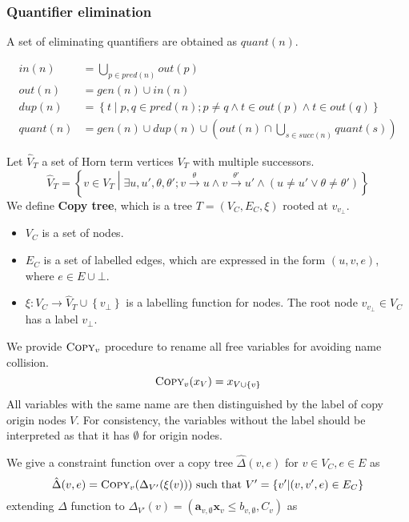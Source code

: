 \documentclass[a4paper,12pt]{article}
\newcommand{\edgel}[3]{#1\xrightarrow{#2}#3}
\begin{document}
\subsubsection{Quantifier elimination}

A set of eliminating quantifiers are obtained as $quant(n)$.

\begin{align*}
in(n) & = \bigcup_{p\in pred(n)} out(p) \\
out(n) & = gen(n) \cup in(n) \\
dup(n) & = \left\lbrace t \middle| p,q \in pred(n); p \ne q \wedge
 t \in out(p) \wedge t \in out(q) \right\rbrace \\
quant(n) & = gen(n) \cup dup(n) \cup
 (out(n) \cap \bigcup_{s \in succ(n)} quant(s))
\end{align*}

Let $\hat V_T$ a set of Horn term vertices $V_T$ with multiple
successors.
\[ \hat V_T = \left\lbrace v \in V_T \middle|
\exists u, u', \theta, \theta';
\edgel{v}{\theta}{u} \wedge \edgel{v}{\theta'}{u'} \wedge
(u \ne u' \vee \theta \ne \theta') \right\rbrace \]
We define \textbf{Copy tree}, which is a tree $T=(V_C,E_C,\xi)$
rooted at $v_{v_\bot}$.
\begin{itemize}
\item $V_C$ is a set of nodes.
\item $E_C$ is a set of labelled edges, which are expressed in the
  form $(u,v,e)$, where $e \in E \cup {\bot}$.
\item $\xi: V_C \rightarrow \hat V_T \cup \left\lbrace v_\bot
  \right\rbrace$ is a labelling function for nodes. The root node
  $v_{v_\bot} \in V_C$ has a label $v_\bot$.
\end{itemize}

We provide $\textsc{Copy}_v$ procedure to rename all free variables
for avoiding name collision.
\[ \textsc{Copy}_v (x_V) = x_{V \cup \left\lbrace v \right\rbrace} \]
All variables with the same name are then distinguished by the label
of copy origin nodes $V$. For consistency, the variables without the
label should be interpreted as that it has $\emptyset$ for origin
nodes.

We give a constraint function over a copy tree
$\hat \Delta(v,e)$ for $v \in V_C, e \in E$ as
\[ \hat \Delta (v,e) = \textsc{Copy}_v (\Delta_{V'} (\xi (v)))
\text{ such that } V' = \left\lbrace v' \middle| (v, v',e) \in E_C \right\rbrace \]
extending $\Delta$ function to
$\Delta_{V'} (v) = (\mathbf{a}_{v,\emptyset} \mathbf{x}_v \leq b_{v,\emptyset}, C_v)$
as
\end{document}
